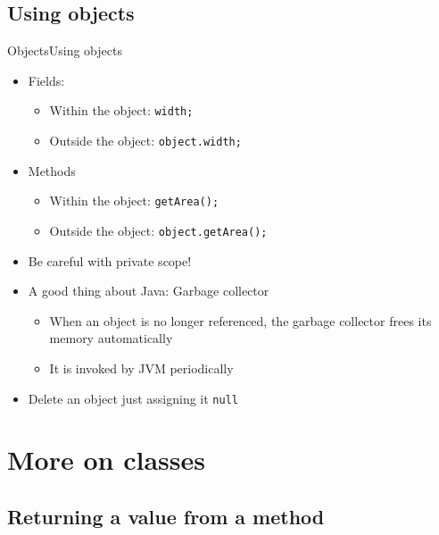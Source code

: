 \documentclass[10pt,compress]{beamer} %
\begin{document}
\subsection{Using objects}
\begin{frame}{Objects}{Using objects}
	\begin{itemize}
	\item Fields:
	\begin{itemize}
		\item Within the object: \texttt{width;}
		\item Outside the object: \texttt{object.width;}
	\end{itemize}
	\item Methods
		\begin{itemize}
		\item Within the object: \texttt{getArea();}
		\item Outside the object: \texttt{object.getArea();}
		\end{itemize}
	\item Be careful with private scope!
	\item A good thing about Java: \alert{Garbage collector}
		\begin{itemize}
		\item When an object is no longer referenced, the garbage collector frees its memory automatically
		\item It is invoked by JVM periodically
		\end{itemize}
	\item Delete an object just assigning it \texttt{null}
	\end{itemize}
\end{frame}

\section{More on classes}
\subsection{Returning a value from a method}
\end{document}
